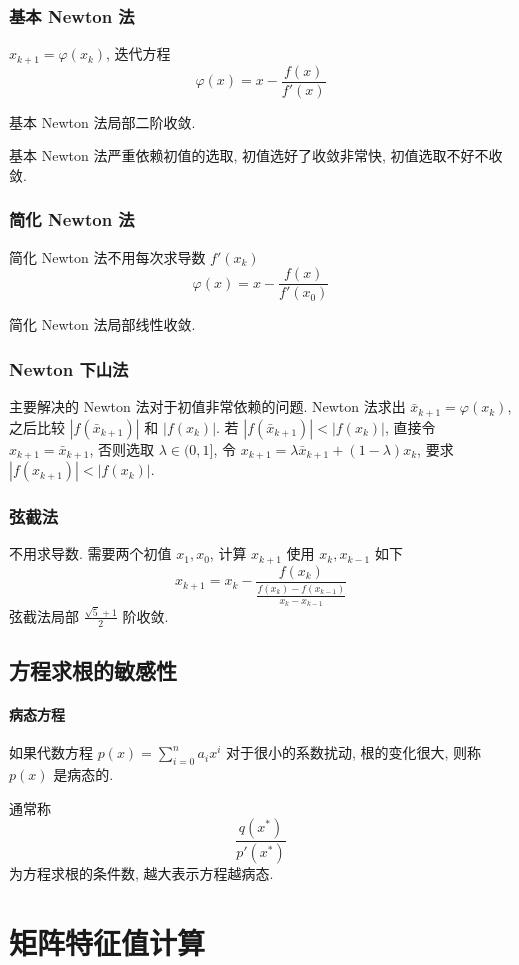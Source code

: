 \documentclass{ctexart}
\begin{document}
\subsubsection{基本 Newton 法}
    $x_{k+1} = \varphi(x_k)$, 迭代方程 \[
        \varphi(x) = x - \frac{f(x)}{f'(x)}\]
    \par
    基本 Newton 法局部二阶收敛.\par
    基本 Newton 法严重依赖初值的选取, 初值选好了收敛非常快, 初值选取不好不收敛.
\subsubsection{简化 Newton 法}
    简化 Newton 法不用每次求导数 $f'(x_k)$\[
        \varphi(x) = x - \frac{f(x)}{f'(x_0)}\]
    \par
    简化 Newton 法局部线性收敛.\par
\subsubsection{Newton 下山法}
    主要解决的 Newton 法对于初值非常依赖的问题.
    Newton 法求出 $\bar{x}_{k+1} = \varphi(x_k)$,
    之后比较 $|f(\bar{x}_{k+1})|$ 和 $|f(x_k)|$.
    若 $|f(\bar{x}_{k+1})| < |f(x_k)|$, 直接令 $x_{k+1} = \bar{x}_{k+1}$,
    否则选取 $\lambda \in (0, 1]$,
    令 $x_{k+1} = \lambda \bar{x}_{k+1} + (1-\lambda) x_k$,
    要求 $|f(x_{k+1})| < |f(x_k)|$.
\subsubsection{弦截法}
    不用求导数.
    需要两个初值 $x_1, x_0$, 计算 $x_{k+1}$ 使用 $x_k, x_{k-1}$ 如下 \[
        x_{k+1} = x_k - \frac{f(x_k)}{\frac{f(x_k) - f(x_{k-1})}{x_k - x_{k-1}}}\]
    弦截法局部 $\frac{\sqrt{5}+1}{2}$ 阶收敛.

\subsection{方程求根的敏感性}
\paragraph{病态方程}
    如果代数方程 $p(x) = \sum_{i=0}^n a_i x^i$ 对于很小的系数扰动,
    根的变化很大, 则称 $p(x)$ 是病态的.\par
    通常称\[
        \frac{q(x^*)}{p'(x^*)}\]
    为方程求根的条件数, 越大表示方程越病态.


\section{矩阵特征值计算}
\end{document}
